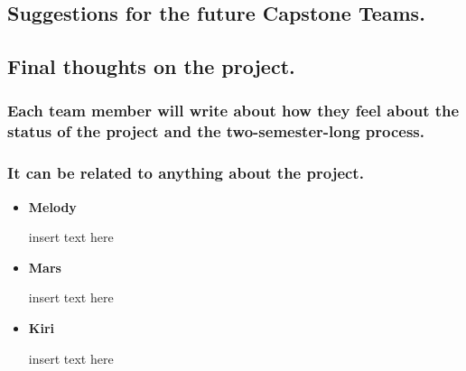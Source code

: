 \documentclass[12pt, letterpaper]{article}
\begin{document}
\subsection{Suggestions for the future Capstone Teams.}

\subsection{Final thoughts on the project.}
\subsubsection{Each team member will write about how they feel about the status of the project and the two-semester-long process.}
\subsubsection{It can be related to anything about the project.}
\begin{itemize}
	\item{\textbf{Melody}}
	
		insert text here
	
	\item{\textbf{Mars}}
	
		insert text here
	
	\item{\textbf{Kiri}}
	
		insert text here
\end{itemize}
\end{document}
